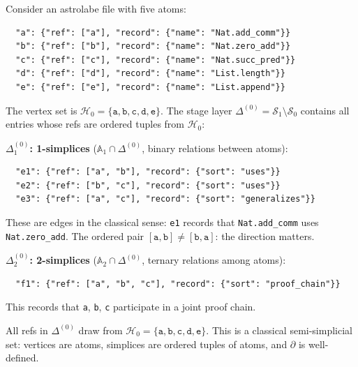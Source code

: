 \begin{example}
\label{ex:delta0}
Consider an astrolabe file with five atoms:
\begin{verbatim}
  "a": {"ref": ["a"], "record": {"name": "Nat.add_comm"}}
  "b": {"ref": ["b"], "record": {"name": "Nat.zero_add"}}
  "c": {"ref": ["c"], "record": {"name": "Nat.succ_pred"}}
  "d": {"ref": ["d"], "record": {"name": "List.length"}}
  "e": {"ref": ["e"], "record": {"name": "List.append"}}
\end{verbatim}
The vertex set is $\mathcal{H}_0 = \{\texttt{a}, \texttt{b}, \texttt{c}, \texttt{d}, \texttt{e}\}$. The stage layer $\Delta^{(0)} = \mathcal{S}_1 \setminus \mathcal{S}_0$ contains all entries whose refs are ordered tuples from $\mathcal{H}_0$:

\medskip
\noindent\textbf{$\Delta^{(0)}_1$: 1-simplices} ($\mathbb{A}_1 \cap \Delta^{(0)}$, binary relations between atoms):
\begin{verbatim}
  "e1": {"ref": ["a", "b"], "record": {"sort": "uses"}}
  "e2": {"ref": ["b", "c"], "record": {"sort": "uses"}}
  "e3": {"ref": ["a", "c"], "record": {"sort": "generalizes"}}
\end{verbatim}
These are edges in the classical sense: \texttt{e1} records that \texttt{Nat.add\_comm} uses \texttt{Nat.zero\_add}. The ordered pair $[\texttt{a}, \texttt{b}] \neq [\texttt{b}, \texttt{a}]$: the direction matters.

\medskip
\noindent\textbf{$\Delta^{(0)}_2$: 2-simplices} ($\mathbb{A}_2 \cap \Delta^{(0)}$, ternary relations among atoms):
\begin{verbatim}
  "f1": {"ref": ["a", "b", "c"], "record": {"sort": "proof_chain"}}
\end{verbatim}
This records that \texttt{a}, \texttt{b}, \texttt{c} participate in a joint proof chain.

\medskip
All refs in $\Delta^{(0)}$ draw from $\mathcal{H}_0 = \{\texttt{a}, \texttt{b}, \texttt{c}, \texttt{d}, \texttt{e}\}$. This is a classical semi-simplicial set: vertices are atoms, simplices are ordered tuples of atoms, and $\partial$ is well-defined.
\end{example}

